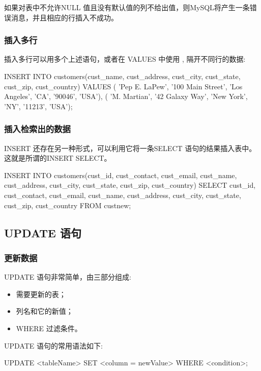 如果对表中不允许NULL 值且没有默认值的列不给出值，则MySQL将产生一条错误消息，并且相应的行插入不成功。

\subsubsection{插入多行}

插入多行可以用多个上述语句，或者在 VALUES 中使用 , 隔开不同行的数据:

\begin{sql}
INSERT INTO customers(cust_name, cust_address, cust_city, cust_state, cust_zip, cust_country)
VALUES ( 'Pep E. LaPew', '100 Main Street', 'Los Angeles', 'CA', '90046', 'USA'),
       ( 'M. Martian', '42 Galaxy Way', 'New York', 'NY', '11213', 'USA');
\end{sql}

\subsubsection{插入检索出的数据}

INSERT 还存在另一种形式，可以利用它将一条SELECT 语句的结果插入表中。这就是所谓的INSERT SELECT。

\begin{sql}
INSERT INTO customers(cust_id, cust_contact, cust_email, cust_name, cust_address, cust_city, cust_state, cust_zip, cust_country)
SELECT cust_id, cust_contact, cust_email, cust_name, cust_address, cust_city, cust_state, cust_zip, cust_country
FROM custnew;
\end{sql}

\subsection{UPDATE 语句}

\subsubsection{更新数据}

UPDATE 语句非常简单，由三部分组成:
\begin{itemize}
    \item 需要更新的表；
    \item 列名和它的新值；
    \item WHERE 过滤条件。
\end{itemize}

UPDATE 语句的常用语法如下:
\begin{sql}
UPDATE <tableName>
    SET <column = newValue>
    WHERE <condition>;
\end{sql}

